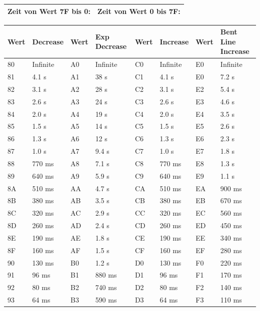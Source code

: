 \begin{table}[htbp]
\begin{tabularx}{\textwidth}{|X|X|}
	\hline
	Zeit von Wert 7F bis 0: & Zeit von Wert 0 bis 7F: \\
	\hline
\end{tabularx}

\begin{tabularx}{\textwidth}{|l|X|l|X|l|X|l|X|}
	\hline
	Wert & Decrease & Wert & Exp Decrease & Wert & Increase & Wert & Bent Line Increase \\
	\hline
	80 & Infinite & A0 & Infinite & C0 & Infinite & E0 & Infinite \\
	\hline
	81 & 4.1 s & A1 & 38 s & C1 & 4.1 s & E0 & 7.2 s \\
	\hline
	82 & 3.1 s & A2 & 28 s & C2 & 3.1 s & E2 & 5.4 s \\
	\hline
	83 & 2.6 s & A3 & 24 s & C3 & 2.6 s & E3 & 4.6 s \\
	\hline
	84 & 2.0 s & A4 & 19 s & C4 & 2.0 s & E4 & 3.5 s \\
	\hline
	85 & 1.5 s & A5 & 14 s & C5 & 1.5 s & E5 & 2.6 s \\
	\hline
	86 & 1.3 s & A6 & 12 s & C6 & 1.3 s & E6 & 2.3 s \\
	\hline
	87 & 1.0 s & A7 & 9.4 s & C7 & 1.0 s & E7 & 1.8 s \\
	\hline
	88 & 770 ms & A8 & 7.1 s & C8 & 770 ms & E8 & 1.3 s \\
	\hline
	89 & 640 ms & A9 & 5.9 s & C9 & 640 ms & E9 & 1.1 s \\
	\hline
	8A & 510 ms & AA & 4.7 s & CA & 510 ms & EA & 900 ms \\
	\hline
	8B & 380 ms & AB & 3.5 s & CB & 380 ms & EB & 670 ms \\
	\hline
	8C & 320 ms & AC & 2.9 s & CC & 320 ms & EC & 560 ms \\
	\hline
	8D & 260 ms & AD & 2.4 s & CD & 260 ms & ED & 450 ms \\
	\hline
	8E & 190 ms & AE & 1.8 s & CE & 190 ms & EE & 340 ms \\
	\hline
	8F & 160 ms & AF & 1.5 s & CF & 160 ms & EF & 280 ms \\
	\hline
	90 & 130 ms & B0 & 1.2 s & D0 & 130 ms & F0 & 220 ms \\
	\hline
	91 & 96 ms & B1 & 880 ms & D1 & 96 ms & F1 & 170 ms \\
	\hline
	92 & 80 ms & B2 & 740 ms & D2 & 80 ms & F2 & 140 ms \\
	\hline
	93 & 64 ms & B3 & 590 ms & D3 & 64 ms & F3 & 110 ms \\

\end{tabularx}
\end{table}
